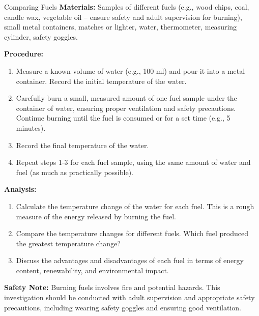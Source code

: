 \begin{investigation}{Comparing Fuels}
\textbf{Materials:} Samples of different fuels (e.g., wood chips, coal, candle wax, vegetable oil – ensure safety and adult supervision for burning),  small metal containers, matches or lighter, water, thermometer, measuring cylinder, safety goggles.

\textbf{Procedure:}
\begin{enumerate}
    \item  Measure a known volume of water (e.g., 100 ml) and pour it into a metal container. Record the initial temperature of the water.
    \item  Carefully burn a small, measured amount of one fuel sample under the container of water, ensuring proper ventilation and safety precautions.  Continue burning until the fuel is consumed or for a set time (e.g., 5 minutes).
    \item  Record the final temperature of the water.
    \item  Repeat steps 1-3 for each fuel sample, using the same amount of water and fuel (as much as practically possible).
\end{enumerate}

\textbf{Analysis:}
\begin{enumerate}
    \item Calculate the temperature change of the water for each fuel. This is a rough measure of the energy released by burning the fuel.
    \item Compare the temperature changes for different fuels. Which fuel produced the greatest temperature change?
    \item Discuss the advantages and disadvantages of each fuel in terms of energy content, renewability, and environmental impact.
\end{enumerate}
\textbf{Safety Note:} Burning fuels involves fire and potential hazards. This investigation should be conducted with adult supervision and appropriate safety precautions, including wearing safety goggles and ensuring good ventilation.
\end{investigation}


